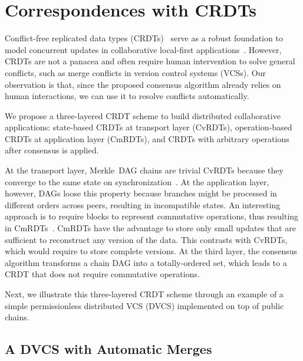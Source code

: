 \documentclass[10pt,journal,compsoc]{IEEEtran}
\begin{document}
\section{Correspondences with CRDTs}
\label{sec.crdts}

Conflict-free replicated data types (CRDTs)~\cite{p2p.crdts} serve as a robust
foundation to model concurrent updates in collaborative local-first
applications~\cite{p2p.local}.
However, CRDTs are not a panacea and often require human intervention to solve
general conflicts, such as merge conflicts in version control systems (VCSs).
%
Our observation is that, since the proposed consensus algorithm already relies
on human interactions, we can use it to resolve conflicts automatically.

We propose a three-layered CRDT scheme to build distributed collaborative
applications:
    state-based CRDTs at transport layer (CvRDTs),
    operation-based CRDTs at application layer (CmRDTs), and
    CRDTs with arbitrary operations after consensus is applied.

At the transport layer, Merkle~DAG chains are trivial CvRDTs because they
converge to the same state on synchronization~\cite{p2p.merkle-crdts}.
%
At the application layer, however, DAGs loose this property because branches
might be processed in different orders across peers, resulting in incompatible
states.
An interesting approach is to require blocks to represent commutative
operations, thus resulting in CmRDTs~\cite{p2p.merkle-crdts}.
%
CmRDTs have the advantage to store only small updates that are sufficient to
reconstruct any version of the data.
This contrasts with CvRDTs, which would require to store complete versions.
%
At the third layer, the consensus algorithm transforms a chain DAG into a
totally-ordered set, which leads to a CRDT that does not require commutative
operations.

Next, we illustrate this three-layered CRDT scheme through an example of a
simple permissionless distributed VCS (DVCS) implemented on top of public
chains.

\subsection{A DVCS with Automatic Merges}
\end{document}
